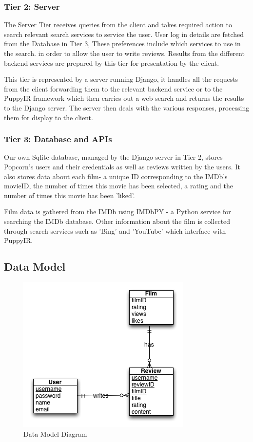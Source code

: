 \documentclass{sig-alt-release2}
\begin{document}
\subsubsection*{Tier 2: Server}
 
The Server Tier receives queries from the client and takes required action to search relevant search services to service the user. User log in details are fetched from the Database in Tier 3, These preferences include which services to use in the search. in order to allow the user to write reviews. Results from the different backend services are prepared by this tier for presentation by the client. 
 
This tier is represented by a server running Django, it handles all the requests from the client forwarding them to the relevant backend service or to the PuppyIR framework which then carries out a web search and returns the results to the Django server. The server then deals with the various responses, processing them for display to the client. 
 
\subsubsection*{Tier 3: Database and APIs}
 
Our own Sqlite database, managed by the Django server in Tier 2, stores Popcorn's users and their credentials as well as reviews written by the users. It also stores data about each film- a unique ID corresponding to the IMDb's movieID, the number of times this movie has been selected, a rating and the number of times this movie has been 'liked'. 
 
Film data is gathered from the IMDb using IMDbPY - a Python service for searching the IMDb database. Other information about the film is collected through search services such as 'Bing' and 'YouTube' which interface with PuppyIR. 
 
\subsection{Data Model}

\begin{figure}[h]
\centering
\includegraphics[scale=0.6]{erdiagram.png}
\caption{Data Model Diagram}
\label{datamodel}
\end{figure}
 
\end{document}
